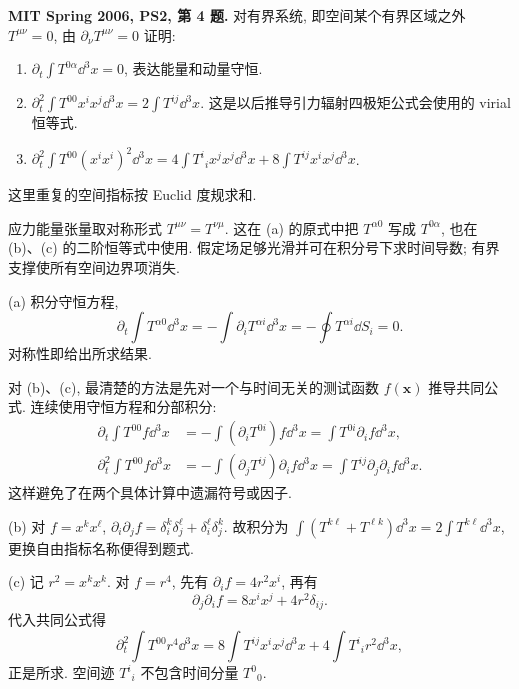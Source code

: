 \begin{exercise}
\textbf{MIT Spring 2006, PS2, 第 4 题.} 对有界系统, 即空间某个有界区域之外 $T^{\mu\nu}=0$, 由 $\partial_\nu T^{\mu\nu}=0$ 证明:
\begin{enumerate}[label=(\alph*)]
\item $\displaystyle\partial_t\int T^{0\alpha}\dd^3x=0$, 表达能量和动量守恒.
\item $\displaystyle\partial_t^2\int T^{00}x^ix^j\dd^3x=2\int T^{ij}\dd^3x$. 这是以后推导引力辐射四极矩公式会使用的 virial 恒等式.
\item $\displaystyle\partial_t^2\int T^{00}(x^ix^i)^2\dd^3x
 =4\int T^i{}_i x^jx^j\dd^3x+8\int T^{ij}x^ix^j\dd^3x$.
\end{enumerate}
这里重复的空间指标按 Euclid 度规求和.
\end{exercise}
\begin{solution}
应力能量张量取对称形式 $T^{\mu\nu}=T^{\nu\mu}$. 这在 (a) 的原式中把 $T^{\alpha0}$ 写成 $T^{0\alpha}$, 也在 (b)、(c) 的二阶恒等式中使用. 假定场足够光滑并可在积分号下求时间导数; 有界支撑使所有空间边界项消失.

(a) 积分守恒方程,
\[
 \partial_t\int T^{\alpha0}\dd^3x=-\int\partial_iT^{\alpha i}\dd^3x
 =-\oint T^{\alpha i}\dd S_i=0.
\]
对称性即给出所求结果.

对 (b)、(c), 最清楚的方法是先对一个与时间无关的测试函数 $f(\boldsymbol x)$ 推导共同公式. 连续使用守恒方程和分部积分:
\begin{align*}
 \partial_t\int T^{00}f\dd^3x
 &=-\int(\partial_iT^{0i})f\dd^3x
 =\int T^{0i}\partial_i f\dd^3x,\\
 \partial_t^2\int T^{00}f\dd^3x
 &=-\int(\partial_jT^{ij})\partial_i f\dd^3x
 =\int T^{ij}\partial_j\partial_i f\dd^3x.
\end{align*}
这样避免了在两个具体计算中遗漏符号或因子.

(b) 对 $f=x^kx^\ell$, $\partial_i\partial_j f=\delta_i^k\delta_j^\ell+\delta_i^\ell\delta_j^k$. 故积分为 $\int(T^{k\ell}+T^{\ell k})\dd^3x=2\int T^{k\ell}\dd^3x$, 更换自由指标名称便得到题式.

(c) 记 $r^2=x^kx^k$. 对 $f=r^4$, 先有 $\partial_i f=4r^2x^i$, 再有
\[
 \partial_j\partial_i f=8x^ix^j+4r^2\delta_{ij}.
\]
代入共同公式得
\[
 \partial_t^2\int T^{00}r^4\dd^3x
 =8\int T^{ij}x^ix^j\dd^3x+4\int T^i{}_i r^2\dd^3x,
\]
正是所求. 空间迹 $T^i{}_i$ 不包含时间分量 $T^0{}_0$.
\end{solution}

